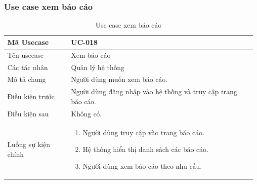 \documentclass[12pt,a4paper]{article}
\begin{document}
    \subsubsection*{Use case xem báo cáo}
    \begin{table}[H]
        \centering
        \begin{tabular}{|p{3.5cm}|p{11.5cm}|c|}
            \hline
            Mã Usecase      & UC-018                                                       \\
            \hline
            Tên usecase     & Xem báo cáo                                                  \\
            \hline
            Các tác nhân    & Quản lý hệ thống                                             \\
            \hline
            Mô tả chung     & Người dùng muốn xem báo cáo.                                 \\
            \hline

            Điều kiện trước & Người dùng đăng nhập vào hệ thống và truy cập trang báo cáo. \\
            \hline

            Điều kiện sau   & Không có.                                                    \\
            \hline

            Luồng sự kiện chính & \vspace{-.8cm}\begin{enumerate}
                                                    \item Người dùng truy cập vào trang báo cáo.
                                                    \item Hệ thống hiển thị danh sách các báo cáo.
                                                    \item Người dùng xem báo cáo theo nhu cầu.
            \end{enumerate}
            \\
            \hline
        \end{tabular}
        \caption{Use case xem báo cáo}

    \end{table}


\end{document}
